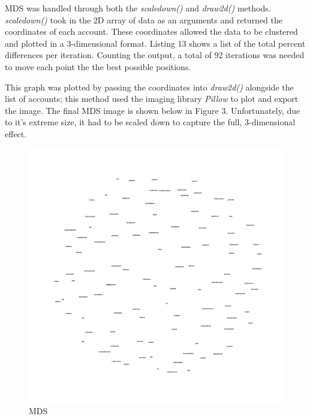 \documentclass[12pt]{article}
\begin{document}
MDS was handled through both the \emph{scaledown()} and \emph{draw2d()} methods. \emph{scaledown()} took in the 2D array of data as an arguments and returned the coordinates of each account. These coordinates allowed the data to be clustered and plotted in a 3-dimensional format. Listing 13 shows a list of the total percent differences per iteration. Counting the output, a total of 92 iterations was needed to move each point the the best possible positions. 

\par This graph was plotted by passing the coordinates into \emph{draw2d()} alongside the list of accounts; this method used the imaging library \emph{Pillow} to plot and export the image. The final MDS image is shown below in Figure 3. Unfortunately, due to it's extreme size, it had to be scaled down to capture the full, 3-dimensional effect. 

\begin{figure}[H]
            \centering
            \includegraphics[scale=0.27,trim = 100 90 100 200, clip]{mds2d.jpg}
            \caption{MDS}
            \label{fig:my_label}
        \end{figure}
        
\end{document}
